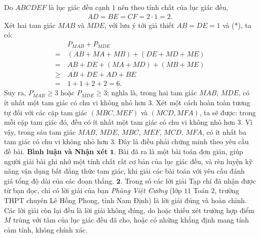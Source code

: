 \begin{multicols}{2}
\begin{figure}[H]
		\vspace*{-10pt}
	\end{figure}
	Do $ABCDEF$ là lục giác đều cạnh $1$ nên theo tính chất của lục giác đều,
	\begin{align*}
		AD = BE = CF = 2 \cdot 1 = 2. \tag{$*$}
	\end{align*}
	Xét hai tam giác $MAB$ và $MDE$, với lưu ý tới giả thiết $AB = DE = 1$ và ($*$), ta có:
	\begin{align*}
			&{P_{MAB}} + {P_{MDE}} \\
			= \,&\left( {AB + MA + MB} \right) + \left( {DE + MD + ME} \right)\\
			 = \,&AB + DE + \left( {MA + MD} \right) + \left( {MB + ME} \right)\\
			 \ge \,&AB + DE + AD + BE\\
			 = \,&1 + 1 + 2 + 2 = 6.
	\end{align*}
	Suy ra, $P_{MAB} \ge 3$  hoặc $P_{MDE} \ge 3$; nghĩa là, trong hai tam giác $MAB$, $MDE$, có ít nhất một tam giác có chu vi không nhỏ hơn $3$.
	\vskip 0.05cm
	Xét một cách hoàn toàn tương tự đối với các cặp tam giác $(MBC, MEF)$ và $(MCD, MFA)$, ta sẽ được: trong mỗi cặp tam giác đó, đều có ít nhất một tam giác có chu vi không nhỏ hơn $3$.
	\vskip 0.05cm
	Vì vậy, trong sáu tam giác $MAB$, $MDE$, $MBC$, $MEF$, $MCD$, $MFA$, có ít nhất ba tam giác có chu vi không nhỏ hơn $3$. Đây là điều phải chứng minh theo yêu cầu đề bài.
	\vskip 0.05cm
	\textbf{\color{thachthuctoanhoc}Bình luận và Nhận xét}
	\vskip 0.05cm
	$\pmb{1.}$ Bài đã ra là một bài toán đơn giản, giúp người giải bài ghi nhớ một tính chất rất cơ bản của lục giác đều, và rèn luyện kỹ năng vận dụng bất đẳng thức tam giác, khi giải các bài toán với yêu cầu đánh giá tổng độ dài của các đoạn thẳng.
	\vskip 0.05cm
	$\pmb{2.}$ Trong số các lời giải Tạp chí đã nhận được từ bạn đọc, chỉ có lời giải của bạn \textit{Phùng Việt Cường} (lớp $11$ Toán $2$, trường THPT chuyên Lê Hồng Phong, tỉnh Nam Định) là lời giải đúng và hoàn chỉnh. Các lời giải còn lại đều là lời giải không đúng, do hoặc thiếu xét trường hợp điểm $M$ trùng với tâm của lục giác đều đã cho, hoặc có những khẳng định mang tính cảm tính, không chính xác.

\end{multicols}
